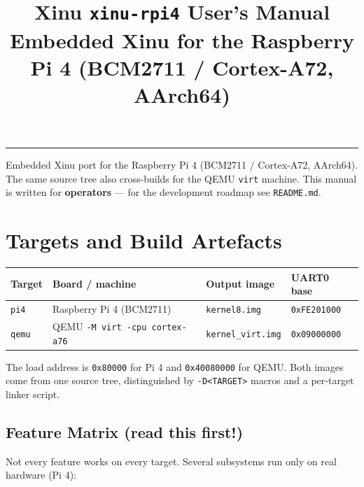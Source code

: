 \documentclass[a4paper,11pt]{article}
\title{\textbf{Xinu \texttt{xinu-rpi4} User's Manual}\\[2pt]
       \large Embedded Xinu for the Raspberry Pi 4 (BCM2711 / Cortex-A72, AArch64)}
\author{}
\date{}
\begin{document}
\maketitle
\vspace{-2.2em}
\begin{center}\rule{0.9\textwidth}{0.4pt}\end{center}

Embedded Xinu port for the Raspberry Pi 4 (BCM2711 / Cortex-A72, AArch64).
The same source tree also cross-builds for the QEMU \texttt{virt} machine.
This manual is written for \textbf{operators} --- for the development
roadmap see \texttt{README.md}.

{\small\tableofcontents}
\bigskip

\section{Targets and Build Artefacts}

\begin{center}\footnotesize
\begin{tabular}{@{}l l l l@{}}
\toprule
\textbf{Target} & \textbf{Board / machine} & \textbf{Output image} & \textbf{UART0 base}\\
\midrule
\verb|pi4|  & Raspberry Pi 4 (BCM2711) & \verb|kernel8.img|     & \verb|0xFE201000|\\
\verb|qemu| & QEMU \verb|-M virt -cpu cortex-a76| & \verb|kernel_virt.img| & \verb|0x09000000|\\
\bottomrule
\end{tabular}
\end{center}

The load address is \verb|0x80000| for Pi 4 and \verb|0x40080000| for QEMU.
Both images come from one source tree, distinguished by \verb|-D<TARGET>|
macros and a per-target linker script.

\subsection{Feature Matrix (read this first!)}

Not every feature works on every target. Several subsystems run only on
real hardware (Pi 4):
\end{document}
